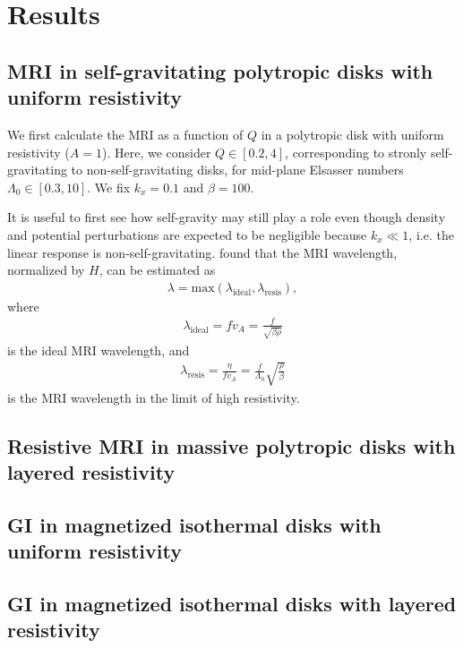 \section{Results}

\subsection{MRI in self-gravitating polytropic disks with uniform
  resistivity}  
We first calculate the MRI as a function of $Q$ in a polytropic disk
with uniform resistivity ($A=1$). Here, we consider $Q\in[0.2,4]$,
corresponding to stronly self-gravitating to non-self-gravitating
disks, for mid-plane Elsasser numbers $\Lambda_0\in[0.3,10]$. We fix $k_x=0.1$ and 
$\beta=100$. 

It is useful to first see how self-gravity may still play a role even
though density and potential perturbations are expected to be
negligible because $k_x\ll1$, i.e. the linear response is
non-self-gravitating. 
\cite{sano99} found that the MRI wavelength, normalized by $H$, can be estimated as
\begin{align}
  \lambda=\mathrm{max}\left(\lambda_\mathrm{ideal},\lambda_\mathrm{resis}\right), 
\end{align}
where
\begin{align}
  \lambda_\mathrm{ideal} = f v_A = \frac{f}{\sqrt{\beta\rho}} 
\end{align}
is the ideal MRI wavelength, and 
\begin{align}
  \lambda_\mathrm{resis} =\frac{\eta}{f v_A}=\frac{f}{\Lambda_0}\sqrt{\frac{\rho}{\beta}}
\end{align}
is the MRI wavelength in the limit of high resistivity. 

\subsection{Resistive MRI in massive polytropic disks with layered
  resistivity} 


\subsection{GI in magnetized isothermal disks with uniform
  resistivity} 


\subsection{GI in magnetized isothermal disks with layered
  resistivity} 
